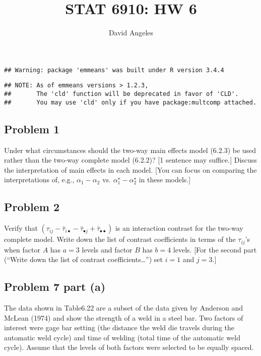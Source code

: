 \documentclass[12pt,]{article}
\title{STAT 6910: HW 6}
\author{David Angeles}
\date{}
\begin{document}
\maketitle

\begin{verbatim}
## Warning: package 'emmeans' was built under R version 3.4.4
\end{verbatim}

\begin{verbatim}
## NOTE: As of emmeans versions > 1.2.3,
##       The 'cld' function will be deprecated in favor of 'CLD'.
##       You may use 'cld' only if you have package:multcomp attached.
\end{verbatim}

\subsection{Problem 1}\label{problem-1}

Under what circumstances should the two-way main effects model (6.2.3)
be used rather than the two-way complete model (6.2.2)? {[}1 sentence
may suffice.{]} Discuss the interpretation of main effects in each
model. {[}You can focus on comparing the interpretations of, e.g.,
\(\alpha_1 - \alpha_2\) vs. \(\alpha_1^\star - \alpha_2^\star\) in these
models.{]}

\subsection{Problem 2}\label{problem-2}

Verify that
\((\tau_{ij} - \bar{\tau}_{i\bullet} - \bar{\tau}_{\bullet j} + \bar{\tau}_{\bullet \bullet})\)
is an interaction contrast for the two-way complete model. Write down
the list of contrast coefficients in terms of the \(\tau_{ij}\)'s when
factor \(A\) has \(a = 3\) levels and factor \(B\) has \(b=4\) levels.
{[}For the second part (``Write down the list of contrast
coefficients\ldots{}'') set \(i=1\) and \(j = 3\).{]}

\subsection{Problem 7 part (a)}\label{problem-7-part-a}

The data shown in Table6.22 are a subset of the data given by Anderson
and McLean (1974) and show the strength of a weld in a steel bar. Two
factors of interest were gage bar setting (the distance the weld die
travels during the automatic weld cycle) and time of welding (total time
of the automatic weld cycle). Assume that the levels of both factors
were selected to be equally spaced.
\end{document}
